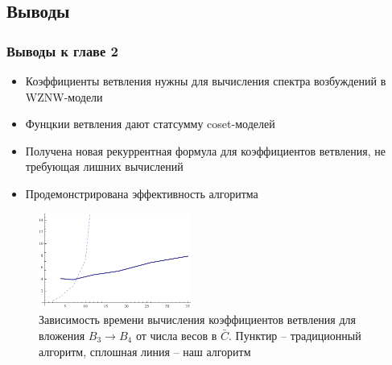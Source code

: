 \documentclass[pdftex]{beamer}
\theoremstyle{definition} \newtheorem{Def}{Определение}
\begin{document}
\subsection{Выводы}
\begin{frame}
  \frametitle{Выводы к главе 2}
  \begin{itemize}
  \item Коэффициенты ветвления нужны для вычисления спектра возбуждений в WZNW-модели 
  \item Фунцкии ветвления дают статсумму coset-моделей
  \item Получена новая рекуррентная формула для коэффициентов ветвления, не требующая лишних вычислений
  \item Продемонстрирована эффективность алгоритма
  \end{itemize}
  \begin{figure}[b]
    \centering
      \includegraphics[width=50mm]{figures/branching-timing}
      \vspace{-0.3cm}
      \caption{Зависимость времени вычисления коэффициентов ветвления для вложения $B_{3}\to B_{4}$ от числа весов в $\bar C$. Пунктир -- традиционный алгоритм, сплошная линия -- наш алгоритм}
      \label{fig:branching}
  \end{figure}
\end{frame}
\end{document}
